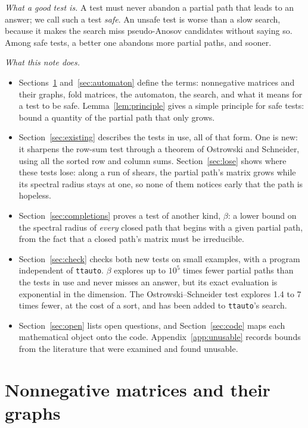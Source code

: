 \documentclass[11pt]{amsart}
\newcommand{\ttauto}{\texttt{ttauto}}
\theoremstyle{plain}
\theoremstyle{definition}
\begin{document}
\emph{What a good test is.}  A test must never abandon a partial path that
leads to an answer; we call such a test \emph{safe}.  An unsafe test is
worse than a slow search, because it makes the search miss pseudo-Anosov
candidates without saying so.  Among safe tests, a better one abandons more
partial paths, and sooner.

\emph{What this note does.}
\begin{itemize}
\item Sections~\ref{sec:matrices} and~\ref{sec:automaton} define the terms:
  nonnegative matrices and their graphs, fold matrices, the automaton,
  the search, and what it means for a test to be safe.
  Lemma~\ref{lem:principle} gives a simple principle for safe tests:
  bound a quantity of the partial path that only grows.
\item Section~\ref{sec:existing} describes the tests in use, all of that
  form.  One is new: it sharpens the row-sum test through a theorem of
  Ostrowski and Schneider, using all the sorted row and column sums.
  Section~\ref{sec:lose} shows where these tests lose: along a run of
  shears, the partial path's matrix grows while its spectral radius stays
  at one, so none of them notices early that the path is hopeless.
\item Section~\ref{sec:completions} proves a test of another kind, $\beta$:
  a lower bound on the spectral radius of \emph{every} closed path that
  begins with a given partial path, from the fact that a closed path's
  matrix must be irreducible.
\item Section~\ref{sec:check} checks both new tests on small examples,
  with a program independent of \ttauto.  $\beta$ explores up to $10^5$
  times fewer partial paths than the tests in use and never misses an
  answer, but its exact evaluation is exponential in the dimension.  The
  Ostrowski--Schneider test explores 1.4 to 7 times fewer, at the cost of
  a sort, and has been added to \ttauto's search.
\item Section~\ref{sec:open} lists open questions, and
  Section~\ref{sec:code} maps each mathematical object onto the code.
  Appendix~\ref{app:unusable} records bounds from the literature that
  were examined and found unusable.
\end{itemize}

\section{Nonnegative matrices and their graphs}
\label{sec:matrices}
\end{document}
